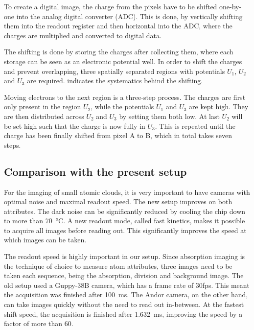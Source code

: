 
To create a digital image, the charge from the pixels have to be shifted one-by-one into the analog digital converter (ADC). This is done, by vertically shifting them into the readout register and then horizontal into the ADC, where the charges are multiplied and converted to digital data.

The shifting is done by storing the charges after collecting them, where each storage can be seen as an electronic potential well. In order to shift the charges and prevent overlapping, three spatially separated regions with potentials $U_1$, $U_2$ and $U_3$ are required.  indicates the systematics behind the shifting.


Moving electrons to the next region is a three-step process. The charges are first only present in the region $U_2$, while the potentials $U_1$ and $U_3$ are kept high. They are then distributed across $U_2$ and $U_3$ by setting them both low. At last $U_2$ will be set high such that the charge is now fully in $U_3$. This is repeated until the charge has been finally shifted from pixel A to B, which in total takes seven steps.


\subsection{Comparison with the present setup}
\label{sec:comparison}
For the imaging of small atomic clouds, it is very important to have cameras with optimal noise and maximal readout speed. The new setup improves on both attributes. The dark noise can be significantly reduced by cooling the chip down to more than \SI{70}{\degreeCelsius}. A new readout mode, called fast kinetics, makes it possible to acquire all images before reading out. This significantly improves the speed at which images can be taken.

The readout speed is highly important in our setup. Since absorption imaging is the technique of choice to measure atom attributes, three images need to be taken each sequence, being the absorption, division and background image.
The old setup used a Guppy-38B \cite{Repp2013} camera, which has a frame rate of 30fps. This meant the acquisition was finished after \SI{100}{\milli\second}. The Andor camera, on the other hand, can take images quickly without the need to read out in-between. At the fastest shift speed, the acquisition is finished after \SI{1.632}{\milli\second}, improving the speed by a factor of more than $60$.

